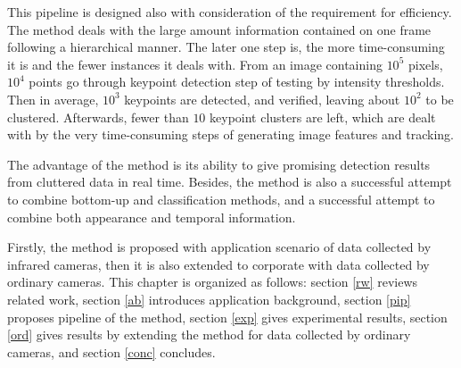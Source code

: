 This pipeline is designed also with consideration of the requirement for efficiency.  The method deals with the large amount information contained on one frame following a hierarchical manner. The later one step is, the more time-consuming it is  and the fewer instances it deals with. From an image containing $10^5$ pixels, $10^4$ points go through keypoint detection step of testing by intensity thresholds. Then in average, $10^3$ keypoints are detected, and verified, leaving about $10^2$ to be clustered. Afterwards, fewer than $10$ keypoint clusters are left, which are dealt with by the very time-consuming steps of generating image features and tracking.

The advantage of the method is its ability to give promising detection results from cluttered data in real time. Besides, the method is also a successful attempt to combine bottom-up and classification methods, and a successful attempt to combine both appearance and temporal information.


Firstly, the method is proposed with application scenario of data collected by infrared cameras, then it is also extended to corporate with data collected by ordinary cameras.
This chapter is organized as follows: section \ref{rw} reviews related work, section \ref{ab} introduces application background, section \ref{pip} proposes pipeline of the method, section \ref{exp} gives experimental results, section \ref{ord} gives results by extending the method for data collected by ordinary cameras, and section \ref{conc} concludes.














